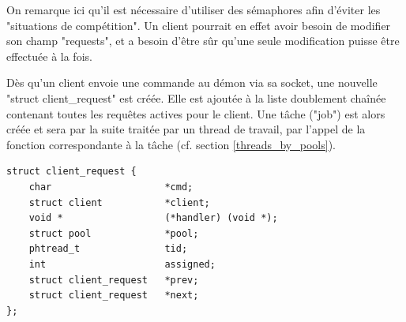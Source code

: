    On remarque ici qu'il est nécessaire d'utiliser des sémaphores afin d'éviter
les "situations de compétition". Un client pourrait en effet avoir besoin de
modifier son champ "requests", et a besoin d'être sûr qu'une seule modification
puisse être effectuée à la fois.

    Dès qu'un client envoie une commande au démon via sa socket, une nouvelle
"struct client\_request" est créée. Elle est ajoutée à la liste doublement
chaînée contenant toutes les requêtes actives pour le client. Une tâche ("job") 
est alors créée et sera par la suite traitée par un thread de travail, par 
l'appel de la fonction correspondante à la tâche (cf. section 
\ref{threads_by_pools}).

\begin{lstlisting}
struct client_request {
    char                    *cmd;
    struct client           *client;
    void *                  (*handler) (void *);
    struct pool             *pool;
    phtread_t               tid;
    int                     assigned;
    struct client_request   *prev;
    struct client_request   *next;
};
\end{lstlisting}


